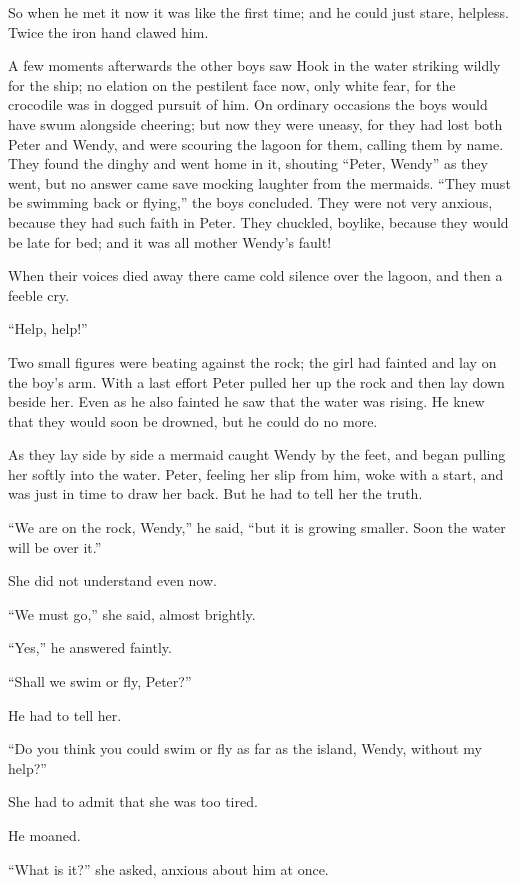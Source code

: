 So when he met it now it was like the first time; and he could just
stare, helpless. Twice the iron hand clawed him.

A few moments afterwards the other boys saw Hook in the water striking
wildly for the ship; no elation on the pestilent face now, only white
fear, for the crocodile was in dogged pursuit of him. On ordinary
occasions the boys would have swum alongside cheering; but now they
were uneasy, for they had lost both Peter and Wendy, and were scouring
the lagoon for them, calling them by name. They found the dinghy and
went home in it, shouting ``Peter, Wendy'' as they went, but no answer
came save mocking laughter from the mermaids. ``They must be swimming
back or flying,'' the boys concluded. They were not very anxious,
because they had such faith in Peter. They chuckled, boylike, because
they would be late for bed; and it was all mother Wendy's fault!

When their voices died away there came cold silence over the lagoon,
and then a feeble cry.

``Help, help!''

Two small figures were beating against the rock; the girl had fainted
and lay on the boy's arm. With a last effort Peter pulled her up the
rock and then lay down beside her. Even as he also fainted he saw that
the water was rising. He knew that they would soon be drowned, but he
could do no more.

As they lay side by side a mermaid caught Wendy by the feet, and began
pulling her softly into the water. Peter, feeling her slip from him,
woke with a start, and was just in time to draw her back. But he had to
tell her the truth.

``We are on the rock, Wendy,'' he said, ``but it is growing smaller. Soon
the water will be over it.''

She did not understand even now.

``We must go,'' she said, almost brightly.

``Yes,'' he answered faintly.

``Shall we swim or fly, Peter?''

He had to tell her.

``Do you think you could swim or fly as far as the island, Wendy,
without my help?''

She had to admit that she was too tired.

He moaned.

``What is it?'' she asked, anxious about him at once.

